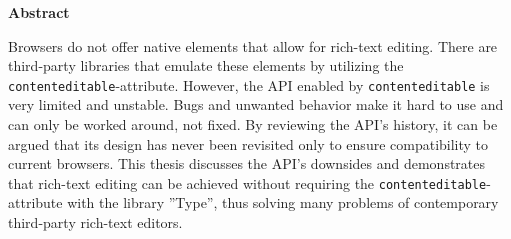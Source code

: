 \thispagestyle{empty}
\noindent \textbf{Abstract}

\noindent Browsers do not offer native elements that allow for rich-text editing. There are third-party libraries that emulate these elements by utilizing the \texttt{contenteditable}-attribute. However, the API enabled by \texttt{contenteditable} is very limited and unstable. Bugs and unwanted behavior make it hard to use and can only be worked around, not fixed. By reviewing the API's history, it can be argued that its design has never been revisited only to ensure compatibility to current browsers. This thesis discusses the API's downsides and demonstrates that rich-text editing can be achieved without requiring the \texttt{contenteditable}-attribute with the library ''Type'', thus solving many problems of contemporary third-party rich-text editors.